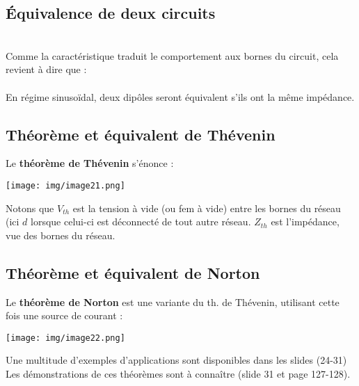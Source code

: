 \documentclass[11pt, a4paper, openany]{book}
\begin{document}
		\subsection{Équivalence de deux circuits}
		\ \\
		
		Comme la caractéristique traduit le comportement aux bornes du circuit, cela revient à dire que :\\
		\ \\
		
		En régime sinusoïdal, deux dipôles seront équivalent s'ils ont la même impédance.
		
		
		\subsection{Théorème et équivalent de Thévenin}
		Le \textbf{théorème de Thévenin} s'énonce :\\
		
		\begin{center}
			\texttt{[image: img/image21.png]}
		\end{center}
		Notons que $V_{th}$ est la tension à vide (ou fem à vide) entre les bornes du réseau (ici $d$ lorsque celui-ci est déconnecté de tout autre réseau. 
		$Z_{th}$ est l'impédance, vue des bornes du réseau.
		
		
		\subsection{Théorème et équivalent de Norton}
		Le \textbf{théorème de Norton} est une variante du th. de Thévenin, utilisant cette fois une source de courant :\\
		\begin{center}
			\texttt{[image: img/image22.png]}
		\end{center}
		
		
		Une multitude d'exemples d'applications sont disponibles dans les slides (24-31)\\
		Les démonstrations de ces théorèmes sont à connaître (slide 31 et page 127-128).
		
\end{document}
